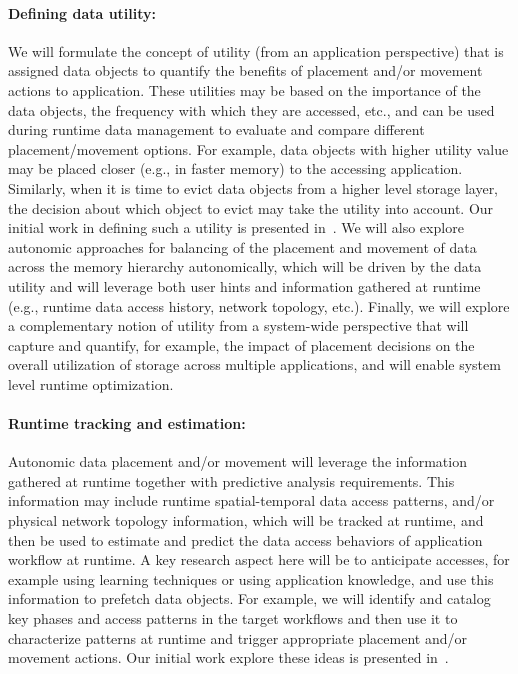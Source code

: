 \paragraph{Defining data utility:} We will formulate the concept of utility (from an
application perspective) that is assigned data objects to quantify the
benefits of placement and/or movement actions to application. These
utilities may be based on the importance of the data objects, the frequency
with which they are accessed, etc., and can be used during runtime data
management to evaluate and compare different placement/movement options. 
For example, data objects with higher utility value may be
placed closer (e.g., in faster memory) to the accessing application.
Similarly, when it is time to evict data objects from a higher level storage
layer, the decision about which object to evict may take the utility into
account. Our initial work in defining such a utility is presented in~\cite{tongipdps15}.
 We will also explore autonomic approaches for balancing of the placement and 
 movement of data across the memory hierarchy autonomically, which will be driven 
 by the data utility and will leverage both user hints and information gathered at runtime (e.g., runtime data access
history, network topology, etc.).
Finally, we will explore a complementary notion of utility from a system-wide perspective 
that will capture and quantify, for example, the impact of placement decisions on 
the overall utilization of storage across multiple applications, and will enable system level runtime optimization. 


\paragraph{ Runtime tracking and estimation:}
Autonomic data placement and/or movement will leverage the information gathered 
at runtime together with predictive analysis requirements. This information may include 
runtime spatial-temporal data access patterns, and/or physical network topology
information, which will be tracked at runtime, and then be used to estimate and predict 
the data access behaviors of application workflow at runtime. 
A key research aspect here will be to anticipate accesses, for example using learning techniques or using
application knowledge, and use this information to prefetch data objects.
For example, we will identify and catalog key phases and access patterns
in the target workflows and then use it to characterize patterns at runtime
and trigger appropriate placement and/or movement actions. Our initial 
work explore these ideas is presented in~\cite{qiansc15,choi2012mining}.

